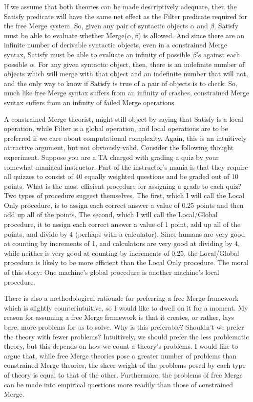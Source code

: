 \documentclass[MilwayThesis]{subfiles}
\begin{document}
If we assume that both theories can be made descriptively adequate, then the Satisfy predicate will have the same net effect as the Filter predicate required for the free Merge system.
So, given any pair of syntactic objects $\alpha$ and $\beta$, Satisfy must be able to evaluate whether Merge($\alpha,\beta$) is allowed.
And since there are an infinite number of derivable syntactic objects, even in a constrained Merge syntax, Satisfy must be able to evaluate an infinity of possible $\beta$'s against each possible $\alpha$.
For any given syntactic object, then, there is an indefinite number of objects which will merge with that object and an indefinite number that will not, and the only way to know if Satisfy is true of a pair of objects is to check.
So, much like free Merge syntax suffers from an infinity of crashes, constrained Merge syntax suffers from an infinity of failed Merge operations.

A constrained Merge theorist, might still object by saying that Satisfy is a local operation, while Filter is a global operation, and local operations are to be preferred if we care about computational complexity.
Again, this is an intuitively attractive argument, but not obviously valid.
Consider the following thought experiment.
Suppose you are a TA charged with grading a quiz by your somewhat maniacal instructor.
Part of the instructor's mania is that they require all quizzes to consist of 40 equally weighted questions and be graded out of 10 points.
What is the most efficient procedure for assigning a grade to each quiz?
Two types of procedure suggest themselves.
The first, which I will call the Local Only procedure, is to assign each correct answer a value of 0.25 points and then add up all of the points.
The second, which I will call the Local/Global procedure, it to assign each correct answer a value of 1 point, add up all of the points, and divide by 4 (perhaps with a calculator).
Since humans are very good at counting by increments of 1, and calculators are very good at dividing by 4, while neither is very good at counting by increments of 0.25, the Local/Global procedure is likely to be more efficient than the Local Only procedure.
The moral of this story: One machine's global procedure is another machine's local procedure.

There is also a methodological rationale for preferring a free Merge framework which is slightly counterintuitive, so I would like to dwell on it for a moment.
My reason for assuming a free Merge framework is that it creates, or rather, lays bare, more problems for us to solve.
Why is this preferable?
Shouldn't we prefer the theory with fewer problems?
Intuitively, we should prefer the less problematic theory, but this depends on how we count a theory's problems.
I would like to argue that, while free Merge theories pose a greater number of problems than constrained Merge theories, the sheer weight of the problems posed by each type of theory is equal to that of the other.
Furthermore, the problems of free Merge can be made into empirical questions more readily than those of constrained Merge.
\end{document}
